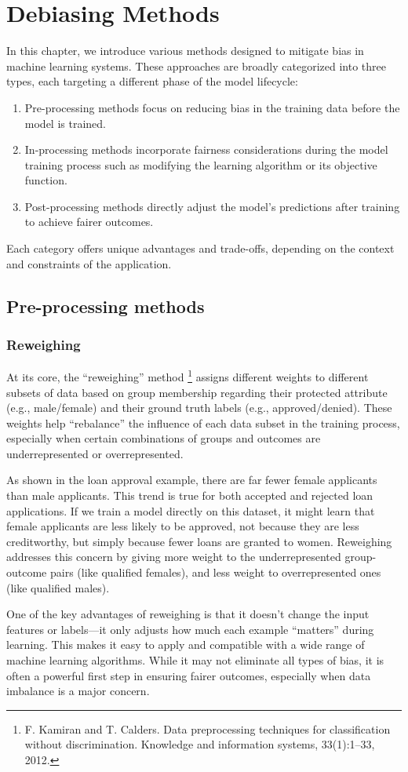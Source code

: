 \section{Debiasing Methods}
In this chapter, we introduce various methods designed to mitigate bias in machine learning systems. These approaches are broadly categorized into three types, each targeting a different phase of the model lifecycle: 
\begin{enumerate}
\item Pre-processing methods focus on reducing bias in the training data before the model is trained.
\item In-processing methods incorporate fairness considerations during the model training process such as modifying the learning algorithm or its objective function.
\item Post-processing methods directly  adjust the model's predictions after training to achieve fairer outcomes.   
\end{enumerate}
\par Each category offers unique advantages and trade-offs, depending on the context and constraints of the application. 
 


\subsection{Pre-processing methods}
\subsubsection{Reweighing}
\par At its core, the “reweighing” method \footnote{F. Kamiran and T. Calders. Data preprocessing techniques for classification without discrimination. Knowledge and information systems, 33(1):1–33, 2012.} assigns different weights to different subsets of data based on group membership regarding their protected attribute (e.g., male/female) and their ground truth labels (e.g., approved/denied). These weights help “rebalance” the influence of each data subset in the training process, especially when certain combinations of groups and outcomes are underrepresented or overrepresented.
\par As shown in the loan approval example, there are far fewer female applicants than male applicants. This trend is true for both accepted and rejected loan applications. If we train a model directly on this dataset, it might learn that female applicants are less likely to be approved, not because they are less creditworthy, but simply because fewer loans are granted to women. Reweighing addresses this concern by giving more weight to the underrepresented group-outcome pairs (like qualified females), and less weight to overrepresented ones (like qualified males).
\par One of the key advantages of reweighing is that it doesn’t change the input features or labels—it only adjusts how much each example “matters” during learning. This makes it easy to apply and compatible with a wide range of machine learning algorithms. While it may not eliminate all types of bias, it is often a powerful first step in ensuring fairer outcomes, especially when data imbalance is a major concern.

